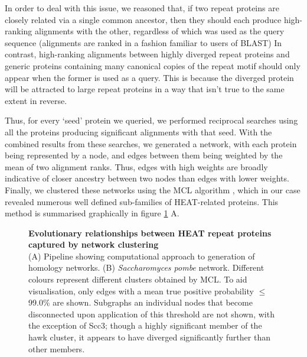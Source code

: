 \documentclass[a4paper,11pt,twoside,openright]{scrbook}
\begin{document}
In order to deal with this issue, we reasoned that, if two repeat proteins are closely related via a single common ancestor, then they should each produce high-ranking alignments with the other, regardless of which was used as the query sequence (alignments are ranked in a fashion familiar to users of BLAST) In contrast, high-ranking alignments between highly diverged repeat proteins and generic proteins containing many canonical copies of the repeat motif should only appear when the former is used as a query. This is because the diverged protein will be attracted to large repeat proteins in a way that isn't true to the same extent in reverse.

Thus, for every `seed' protein we queried, we performed reciprocal searches using all the proteins producing significant alignments with that seed. With the combined results from these searches, we generated a network, with each protein being represented by a node, and edges between them being weighted by the mean of two alignment ranks. Thus, edges with high weights are broadly indicative of closer ancestry between two nodes than edges with lower weights. Finally, we clustered these networks using the MCL algorithm \cite{VanDongen2000}, which in our case revealed numerous well defined sub-families of HEAT-related proteins. This method is summarised graphically in figure \ref{c2f2} A.

\begin{figure}[h]
    \caption[Evolutionary relationships between HEAT repeat proteins captured by network clustering]{\sffamily \textbf{Evolutionary relationships between HEAT repeat proteins captured by network clustering} \\ \small (A) Pipeline showing computational approach to generation of homology networks. (B) \textit{Saccharomyces pombe} network. Different colours represent different clusters obtained by MCL. To aid visualisation, only edges with a mean true positive probability $\leq$ 99.0\% are shown. Subgraphs an individual nodes that become disconnected upon application of this threshold are not shown, with the exception of Scc3; though a highly significant member of the hawk cluster, it appears to have diverged significantly further than other members.}
    \label{c2f2}
\end{figure}
\end{document}
